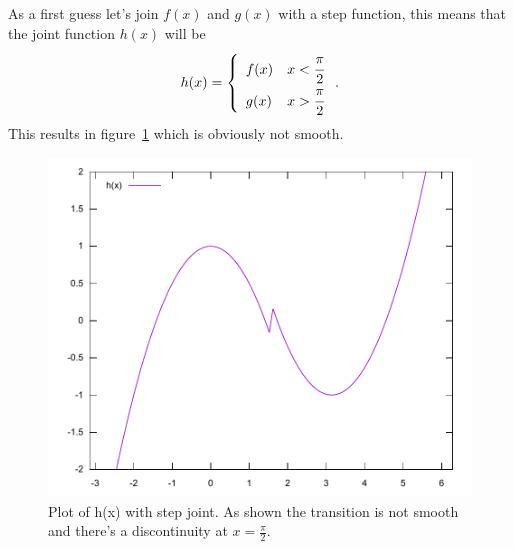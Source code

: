 \documentclass[11pt,DIV=10,final]{scrreprt} %
\begin{document}
As a first guess let's join $f(x)$ and $g(x)$ with a step function, this means that the joint function $h(x)$ will be
\[
  h(x) =  \left\{
    \begin{array}{ll}
           f(x) & x < \cfrac{\pi}{2} \\
           g(x) & x > \cfrac{\pi}{2}
    \end{array}
    \right..
\]
This results in figure~\ref{fig:joint-step} which is obviously not smooth.
\begin{figure}[H]
  \centering
  \includegraphics[width=.9\textwidth]{plots/step_joint.pdf}
  \caption{Plot of h(x) with step joint. As shown the transition is not smooth and there's a discontinuity at $x = \frac{\pi}{2}$.}\label{fig:joint-step}
\end{figure}
\end{document}
